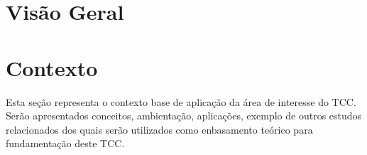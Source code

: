 \section{Visão Geral}

\section{Contexto}

Esta seção representa o contexto base de aplicação da área de
interesse do TCC. Serão apresentados conceitos, ambientação, aplicações,
exemplo de outros estudos relacionados dos quais serão utilizados como
enbasamento teórico para fundamentação deste TCC.


